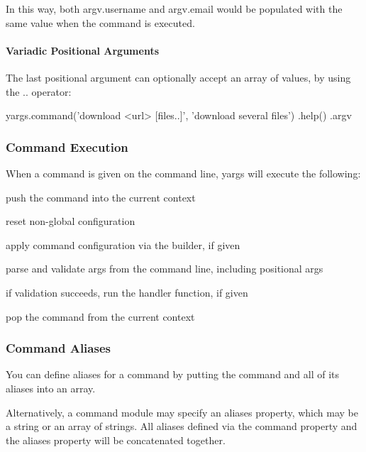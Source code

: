 In this way, both {\ttfamily argv.\+username} and {\ttfamily argv.\+email} would be populated with the same value when the command is executed.

\paragraph*{Variadic Positional Arguments}

The last positional argument can optionally accept an array of values, by using the {\ttfamily ..} operator\+:


\begin{DoxyCode}
yargs.command('download <url> [files..]', 'download several files')
  .help()
  .argv
\end{DoxyCode}


\subsubsection*{Command Execution}

When a command is given on the command line, yargs will execute the following\+:


\begin{DoxyEnumerate}
\item push the command into the current context
\item reset non-\/global configuration
\item apply command configuration via the {\ttfamily builder}, if given
\item parse and validate args from the command line, including positional args
\item if validation succeeds, run the {\ttfamily handler} function, if given
\item pop the command from the current context
\end{DoxyEnumerate}

\subsubsection*{Command Aliases}

You can define aliases for a command by putting the command and all of its aliases into an array.

Alternatively, a command module may specify an {\ttfamily aliases} property, which may be a string or an array of strings. All aliases defined via the {\ttfamily command} property and the {\ttfamily aliases} property will be concatenated together.

